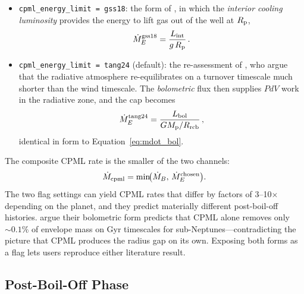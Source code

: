 \documentclass{aastex701}
\newcommand{\Mdot}{\dot{M}}
\newcommand{\Mp}{M_{\rm p}}
\newcommand{\Rrcb}{R_{\rm rcb}}
\newcommand{\Rp}{R_{\rm p}}
\newcommand{\Lint}{L_{\rm int}}
\begin{document}
\begin{itemize}
  \item \texttt{cpml\_energy\_limit = gss18}: the form of
        \citet{Ginzburg2018, Gupta2019, Rogers2021}, in which the
        \emph{interior cooling luminosity} provides the energy to
        lift gas out of the well at $\Rp$,
        \begin{equation}\label{eq:mdot_E_gss18}
          \Mdot_{E}^{\rm gss18}
            = \frac{\Lint}{g\,\Rp}\,.
        \end{equation}
  \item \texttt{cpml\_energy\_limit = tang24} (default): the
        re-assessment of \citet{Tang2024}, who argue that the
        radiative atmosphere re-equilibrates on a turnover timescale
        much shorter than the wind timescale.  The \emph{bolometric}
        flux then supplies $PdV$ work in the radiative zone, and the
        cap becomes
        \begin{equation}\label{eq:mdot_E_tang24}
          \Mdot_{E}^{\rm tang24}
            = \frac{L_{\rm bol}}{G\Mp/\Rrcb}\,,
        \end{equation}
        identical in form to Equation~\eqref{eq:mdot_bol}.
\end{itemize}

The composite CPML rate is the smaller of the two channels:
\begin{equation}\label{eq:mdot_cpml}
  \Mdot_{\rm cpml}
    = \min\!\bigl(\Mdot_{B},\,\Mdot_{E}^{\rm chosen}\bigr).
\end{equation}
The two flag settings can yield CPML rates that differ by factors of
3--10$\times$ depending on the planet, and they predict materially
different post-boil-off histories.  \citet{Tang2024} argue their
bolometric form predicts that CPML alone removes only $\sim 0.1\%$ of
envelope mass on Gyr timescales for sub-Neptunes---contradicting the
\citet{Ginzburg2018} picture that CPML produces the radius gap on its
own.  Exposing both forms as a flag lets users reproduce either
literature result.

\subsection{Post-Boil-Off Phase}\label{subsec:postboiloff}
\end{document}
